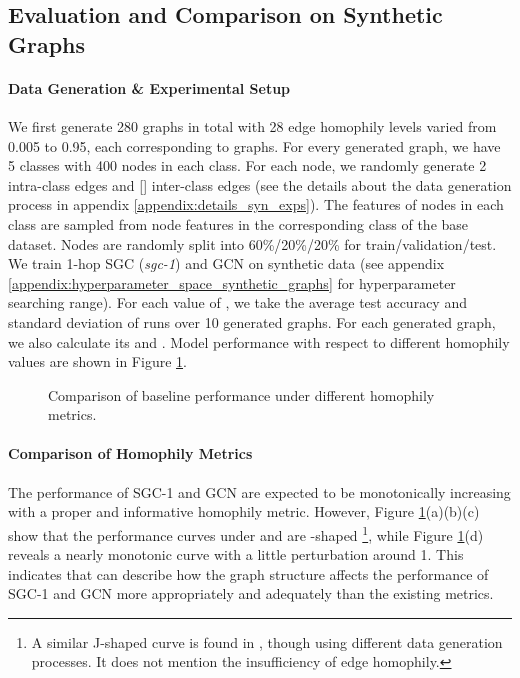 \documentclass{article}
\newcommand{\0}{{\boldsymbol{0}}}
\newcommand{\6}{{\partial}}
\newcommand{\8}{{\infty}}
\newcommand{\4}{{\nabla}}
\begin{document}
\subsection{Evaluation and Comparison on Synthetic Graphs}
\paragraph{Data Generation \& Experimental Setup}
We first generate 280 graphs in total with 28 edge homophily levels varied from 0.005 to 0.95, each corresponding to  graphs. For every generated graph, we have 5 classes with 400 nodes in each class. For each node, we randomly generate 2 intra-class edges and [] inter-class edges (see the details about the data generation process in appendix \ref{appendix:details_syn_exps}). The features of nodes in each class are sampled from node features in the corresponding class of the base dataset. Nodes are randomly split into 60\%/20\%/20\% for train/validation/test. We train 1-hop SGC (\textit{sgc-1}) \cite{wu2019simplifying} and GCN \cite{kipf2016classification} on synthetic data  (see appendix \ref{appendix:hyperparameter_space_synthetic_graphs} for hyperparameter searching range). For each value of , we take the average test accuracy and standard deviation of runs over 10 generated graphs. For each generated graph, we also calculate its  and . Model performance with respect to different homophily values are shown in Figure \ref{fig:comparison_homophily_metrics}.
\begin{figure}[h]
     {
     }
     \caption{Comparison of baseline performance under different homophily metrics.}
     \label{fig:comparison_homophily_metrics}
\end{figure}
\paragraph{Comparison of Homophily Metrics}
The performance of SGC-1 and GCN are expected to be monotonically increasing with a proper and informative homophily metric. However, Figure \ref{fig:comparison_homophily_metrics}(a)(b)(c) show that the performance curves under  and  are -shaped \footnote{A similar J-shaped curve is found in \cite{zhu2020beyond}, though using different data generation processes. It does not mention the insufficiency of edge homophily.}, while Figure \ref{fig:comparison_homophily_metrics}(d) reveals a nearly monotonic curve with a little perturbation around 1. This indicates that  can describe how the graph structure affects the performance of SGC-1 and GCN more appropriately and adequately than the existing metrics.
\end{document}
